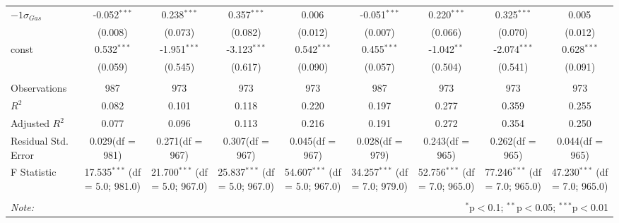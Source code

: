 \begin{table}[!htbp]
\begin{tabular}{@{\extracolsep{5pt}}lcccccccc}
 ${	-1 \sigma}_{Gas}$ & -0.052$^{***}$ & 0.238$^{***}$ & 0.357$^{***}$ & 0.006$^{}$ & -0.051$^{***}$ & 0.220$^{***}$ & 0.325$^{***}$ & 0.005$^{}$ \\
  & (0.008) & (0.073) & (0.082) & (0.012) & (0.007) & (0.066) & (0.070) & (0.012) \\
 const & 0.532$^{***}$ & -1.951$^{***}$ & -3.123$^{***}$ & 0.542$^{***}$ & 0.455$^{***}$ & -1.042$^{**}$ & -2.074$^{***}$ & 0.628$^{***}$ \\
  & (0.059) & (0.545) & (0.617) & (0.090) & (0.057) & (0.504) & (0.541) & (0.091) \\
\hline \\[-1.8ex]
 Observations & 987 & 973 & 973 & 973 & 987 & 973 & 973 & 973 \\
 $R^2$ & 0.082 & 0.101 & 0.118 & 0.220 & 0.197 & 0.277 & 0.359 & 0.255 \\
 Adjusted $R^2$ & 0.077 & 0.096 & 0.113 & 0.216 & 0.191 & 0.272 & 0.354 & 0.250 \\
 Residual Std. Error & 0.029(df = 981) & 0.271(df = 967) & 0.307(df = 967) & 0.045(df = 967) & 0.028(df = 979) & 0.243(df = 965) & 0.262(df = 965) & 0.044(df = 965)  \\
 F Statistic & 17.535$^{***}$ (df = 5.0; 981.0) & 21.700$^{***}$ (df = 5.0; 967.0) & 25.837$^{***}$ (df = 5.0; 967.0) & 54.607$^{***}$ (df = 5.0; 967.0) & 34.257$^{***}$ (df = 7.0; 979.0) & 52.756$^{***}$ (df = 7.0; 965.0) & 77.246$^{***}$ (df = 7.0; 965.0) & 47.230$^{***}$ (df = 7.0; 965.0) \\
\hline
\hline \\[-1.8ex]
\textit{Note:} & \multicolumn{8}{r}{$^{*}$p$<$0.1; $^{**}$p$<$0.05; $^{***}$p$<$0.01} \\
\end{tabular}
\end{table}